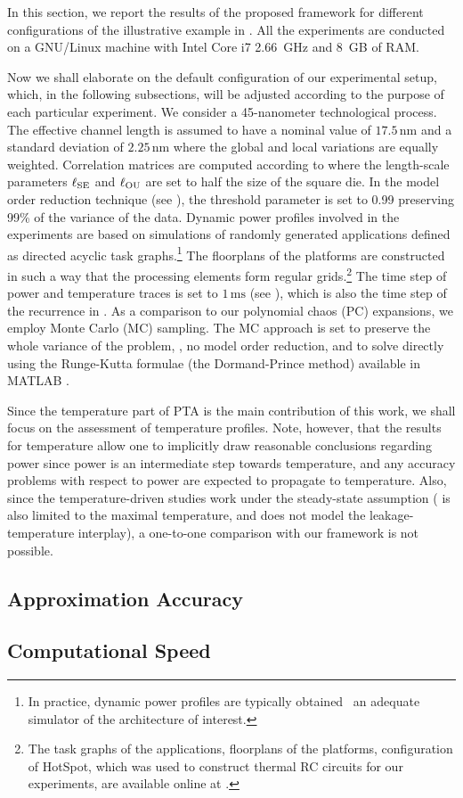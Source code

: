 
In this section, we report the results of the proposed framework for different configurations of the illustrative example in .
All the experiments are conducted on a GNU/Linux machine with Intel Core i7 2.66~GHz and 8~GB of RAM.

Now we shall elaborate on the default configuration of our experimental setup, which, in the following subsections, will be adjusted according to the purpose of each particular experiment.
We consider a 45-nanometer technological process.
The effective channel length is assumed to have a nominal value of $17.5\,\text{nm}$ \cite{ptm} and a standard deviation of $2.25\,\text{nm}$ where the global and local variations are equally weighted.
Correlation matrices are computed according to  where the length-scale parameters $\ell_{\text{SE}}$ and $\ell_{\text{OU}}$ are set to half the size of the square die.
In the model order reduction technique (see ), the threshold parameter is set to 0.99 preserving 99\% of the variance of the data.
Dynamic power profiles involved in the experiments are based on simulations of randomly generated applications defined as directed acyclic task graphs.\footnote{In practice, dynamic power profiles are typically obtained \via\ an adequate simulator of the architecture of interest.}
The floorplans of the platforms are constructed in such a way that the processing elements form regular grids.\footnote{The task graphs of the applications, floorplans of the platforms, configuration of HotSpot, which was used to construct thermal RC circuits for our experiments, are available online at \cite{sources}.}
The time step of power and temperature traces is set to $1\,\text{ms}$ (see ), which is also the time step of the recurrence in .
As a comparison to our polynomial chaos (PC) expansions, we employ Monte Carlo (MC) sampling.
The MC approach is set to preserve the whole variance of the problem, \ie, no model order reduction, and to solve  directly using the Runge-Kutta formulae (the Dormand-Prince method) available in MATLAB \cite{matlab}.

Since the temperature part of PTA is the main contribution of this work, we shall focus on the assessment of temperature profiles.
Note, however, that the results for temperature allow one to implicitly draw reasonable conclusions regarding power since power is an intermediate step towards temperature, and any accuracy problems with respect to power are expected to propagate to temperature.
Also, since the temperature-driven studies \cite{juan2011, juan2012, huang2009, lee2013} work under the steady-state assumption (\cite{juan2011} is also limited to the maximal temperature, and \cite{huang2009} does not model the leakage-temperature interplay), a one-to-one comparison with our framework is not possible.

\subsection{Approximation Accuracy} 


\subsection{Computational Speed} 

